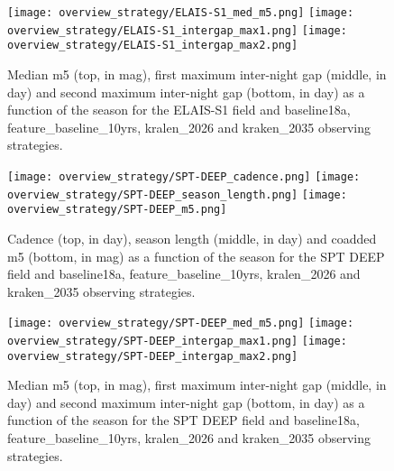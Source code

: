 \begin{figure}[!htbp]
\begin{center}
  
  \texttt{[image: overview\_strategy/ELAIS-S1\_med\_m5.png]}
  \texttt{[image: overview\_strategy/ELAIS-S1\_intergap\_max1.png]}
    \texttt{[image: overview\_strategy/ELAIS-S1\_intergap\_max2.png]}
 \caption{Median m5 (top, in mag), first maximum inter-night gap (middle, in day) and second maximum inter-night gap (bottom, in day)  as a function of the season for the ELAIS-S1 field and baseline18a, feature\_baseline\_10yrs, kralen\_2026 and kraken\_2035 observing strategies.}\label{fig:elais-s1_m5}
\end{center}
\end{figure}




\begin{figure}[!htbp]
\begin{center}
  \texttt{[image: overview\_strategy/SPT-DEEP\_cadence.png]}
  \texttt{[image: overview\_strategy/SPT-DEEP\_season\_length.png]}
  \texttt{[image: overview\_strategy/SPT-DEEP\_m5.png]}
 \caption{Cadence (top, in day), season length (middle, in day) and coadded m5 (bottom, in mag) as a function of the season for the SPT DEEP field and baseline18a, feature\_baseline\_10yrs, kralen\_2026 and kraken\_2035 observing strategies.}\label{fig:spt deep_cad}
\end{center}
\end{figure}

\begin{figure}[!htbp]
\begin{center}
  
  \texttt{[image: overview\_strategy/SPT-DEEP\_med\_m5.png]}
  \texttt{[image: overview\_strategy/SPT-DEEP\_intergap\_max1.png]}
    \texttt{[image: overview\_strategy/SPT-DEEP\_intergap\_max2.png]}
 \caption{Median m5 (top, in mag), first maximum inter-night gap (middle, in day) and second maximum inter-night gap (bottom, in day)  as a function of the season for the SPT DEEP field and baseline18a, feature\_baseline\_10yrs, kralen\_2026 and kraken\_2035 observing strategies.}\label{fig:spt deep_m5}
\end{center}
\end{figure}




